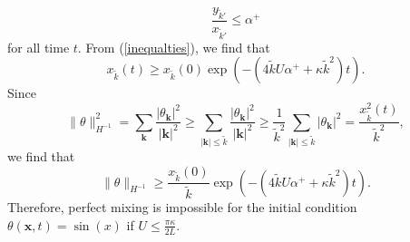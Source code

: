 \documentclass[12pt]{article}
\begin{document}
\begin{equation}
\frac{y_{\tilde{k}'}}{x_{\tilde{k}'}}\leq \alpha^{+} 
\end{equation}
for all time $t$. From (\ref{inequalties}), we find that
\begin{equation}
x_{\tilde{k}}(t)\geq x_{\tilde{k}}(0)\exp(-(4\tilde{k}U\alpha^{+}+\kappa\tilde{k}^2)t).
\end{equation}
Since
\begin{equation}
\|\theta\|_{H^{-1}}^2=\sum_{\mathbf{k}}\frac{|\theta_{\mathbf{k}}|^2}{|\mathbf{k}|^2}\geq \sum_{|\mathbf{k}|\leq \tilde{k}}\frac{|\theta_{\mathbf{k}}|^2}{|\mathbf{k}|^2} \geq \frac{1}{\tilde{k}^{2}}\sum_{|\mathbf{k}|\leq \tilde{k}}|\theta_{\mathbf{k}}|^2 = \frac{x_{\tilde{k}}^2(t)}{\tilde{k}^2},
\end{equation}
we find that
\begin{equation}
\|\theta\|_{H^{-1}}\geq  \frac{x_{\tilde{k}}(0)}{\tilde{k}}\exp(-(4\tilde{k}U\alpha^{+}+\kappa\tilde{k}^2)t).
\end{equation}
Therefore, perfect mixing is impossible for the initial condition $\theta(\mathbf{x},t)=\sin(x)$ if $U\leq \frac{\pi \kappa}{2L}$.
\end{document}
